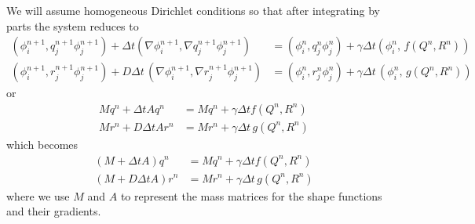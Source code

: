 \documentclass{article}
\begin{document}
We will assume homogeneous Dirichlet conditions so that after integrating by
parts the system reduces to
\begin{align}
    (\phi_i^{n+1}, q_j^{n+1}\phi_j^{n+1}) + \Delta t (\nabla \phi_i^{n+1}, \nabla q_j^{n+1} \phi_j^{n+1})
    &= (\phi_i^{n}, q_j^{n}\phi_j^{n}) + \gamma \Delta t (\phi_i^{n},\, f(Q^{n}, R^{n}))\\
    (\phi_i^{n+1}, r_j^{n+1} \phi_j^{n+1}) + D\Delta t\, (\nabla \phi_i^{n+1},\nabla r_j^{n+1}\phi_j^{n+1})
    &= (\phi_i^n, r_j^{n}\phi_j^{n}) + \gamma \Delta t\, (\phi_i^{n},\, g(Q^{n}, R^{n}))
\end{align}
or
\begin{align}
    Mq^n + \Delta t Aq^n
    &= Mq^{n} + \gamma \Delta t f(Q^{n}, R^{n})\\
    Mr^n + D\Delta t Ar^n
    &= Mr^{n} + \gamma \Delta t\, g(Q^{n}, R^{n})
\end{align}
which becomes
\begin{align}
    (M + \Delta t A)q^n
    &= Mq^{n} + \gamma \Delta t f(Q^{n}, R^{n})\\
    (M + D\Delta t A)r^n
    &= Mr^{n} + \gamma \Delta t\, g(Q^{n}, R^{n})
\end{align}
where we use $M$ and $A$ to represent the mass matrices for the shape functions
and their gradients.
\end{document}
